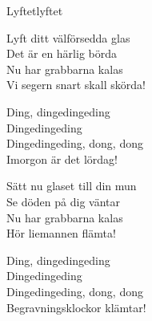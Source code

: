 \begin{song}{Lyftet}{lyftet}
\begin{vers}
Lyft ditt välförsedda glas\\
Det är en härlig börda\\
Nu har grabbarna kalas\\
Vi segern snart skall skörda!\\
\end{vers}
\begin{vers}
\repopen Ding, dingedingeding\\
Dingedingeding\\
Dingedingeding, dong, dong\\
Imorgon är det lördag! \repclose\\
\end{vers}
\begin{vers}
Sätt nu glaset till din mun\\
Se döden på dig väntar\\
Nu har grabbarna kalas\\
Hör liemannen flämta!\\
\end{vers}
\begin{vers}
\repopen Ding, dingedingeding\\
Dingedingeding\\
Dingedingeding, dong, dong\\
Begravningsklockor klämtar! \repclose\\
\end{vers}
\end{song}
